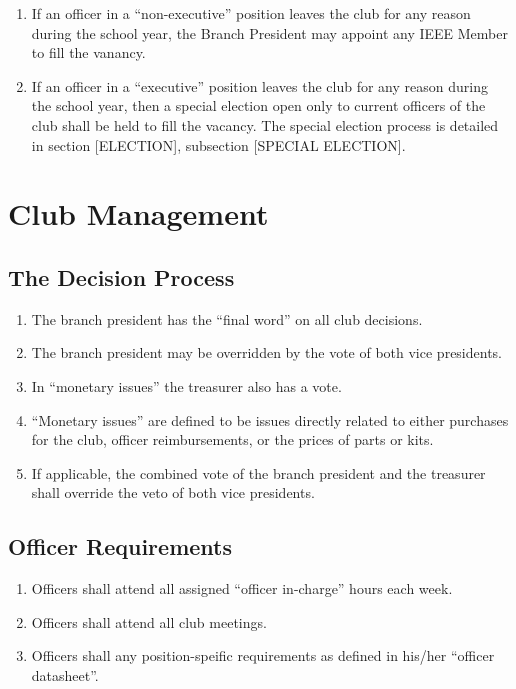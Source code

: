 \documentclass{article}
\begin{document}
\begin{enumerate}
\item If an officer in a ``non-executive'' position leaves the club for any reason during the school year, the Branch President may appoint any IEEE Member to fill the vanancy.
\item If an officer in a ``executive'' position leaves the club for any reason during the school year, then a special election open only to current officers of the club shall be held to fill the vacancy. The special election process is detailed in section [ELECTION], subsection [SPECIAL ELECTION].
\end{enumerate}

\section{Club Management}

\subsection{The Decision Process}
\begin{enumerate}
\item The branch president has the ``final word'' on all club decisions.
\item The branch president may be overridden by the vote of both vice presidents.
\item In ``monetary issues'' the treasurer also has a vote.
\item ``Monetary issues'' are defined to be issues directly related to either purchases for the club, officer reimbursements, or the prices of parts or kits.
\item If applicable, the combined vote of the branch president and the treasurer shall override the veto of both vice presidents.
\end{enumerate}

\subsection{Officer Requirements}
\begin{enumerate}
\item Officers shall attend all assigned ``officer in-charge'' hours each week.
\item Officers shall attend all club meetings.
\item Officers shall any position-speific requirements as defined in his/her ``officer datasheet''.
\end{enumerate}
\end{document}
